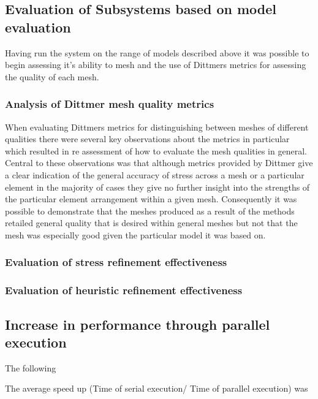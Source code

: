 \newpage
\subsection{Evaluation of Subsystems based on model evaluation}
Having run the system on the range of models described above it was possible to begin assessing it's ability to mesh and the use of Dittmers metrics for assessing 
the quality of each mesh.

\subsubsection{Analysis of Dittmer mesh quality metrics}
When evaluating Dittmers metrics for distinguishing between meshes of different qualities there were several key observations about the metrics in particular which resulted in re assessment of how to evaluate the mesh qualities in general.
Central to these observations was that although metrics provided by Dittmer give a clear indication of the general accuracy of stress across a mesh or a particular element in the majority of cases they give no further insight into the strengths of the particular element arrangement within a given mesh. Consequently it was possible to demonstrate that the meshes produced as a result of the methods retailed general quality that is desired within general meshes but not that the mesh was especially good given the particular model it was based on. \\





\subsubsection{Evaluation of stress refinement effectiveness}

\subsubsection{Evaluation of heuristic refinement effectiveness}



\subsection{Increase in performance through parallel execution}
The following 

The average speed up (Time of serial execution/ Time of parallel execution) was 


